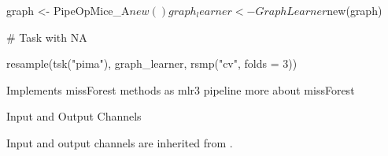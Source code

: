 \documentclass[letterpaper]{book}
\begin{document}
%
\begin{Examples}
\begin{ExampleCode}
{
  graph <- PipeOpMice_A$new() %
  graph_learner <- GraphLearner$new(graph)

  # Task with NA

  resample(tsk("pima"), graph_learner, rsmp("cv", folds = 3))
}
\end{ExampleCode}
\end{Examples}
%
\begin{Description}\relax
Implements missForest methods as mlr3 pipeline more about missForest 
\end{Description}
%
\begin{Section}{Input and Output Channels}

Input and output channels are inherited from .
\end{Section}
%
\end{document}
